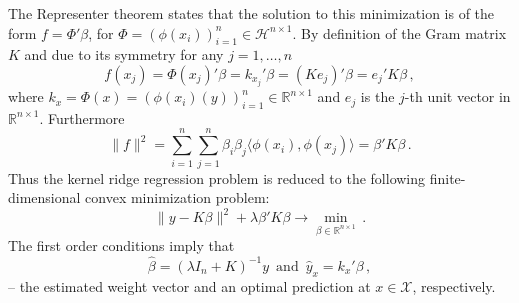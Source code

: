 \documentclass[a4paper,14pt]{extarticle}
\newcommand{\Hcal}{\mathcal{H}}
\newcommand{\Xcal}{\mathcal{X}}
\newcommand{\Real}{\mathbb{R}}
\begin{document}
The Representer theorem states that the solution to this minimization is of the form
$f = \Phi'\beta$, for $\Phi = (\phi(x_i))_{i=1}^n \in \Hcal^{n\times 1}$. By definition
of the Gram matrix $K$ and due to its symmetry for any $j=1,\ldots,n$
\begin{equation*}
  f(x_j)
    = \Phi(x_j)' \beta
    = k_{x_j}' \beta
    = (K e_j)' \beta
    = e_j' K \beta
    \,,
\end{equation*}
where $k_x = \Phi(x) = (\phi(x_i)(y))_{i=1}^n \in \Real^{n\times 1}$ and $e_j$ is
the $j$-th unit vector in $\Real^{n\times 1}$. Furthermore
\begin{equation*}
  \| f \|^2
    = \sum_{i=1}^n\sum_{j=1}^n\beta_i\beta_j \langle\phi(x_i), \phi(x_j)\rangle
    = \beta' K \beta \,.
\end{equation*}
Thus the kernel ridge regression problem is reduced to the following finite-dimensional
convex minimization problem:
\begin{equation*}
  \|y - K \beta \|^2 + \lambda \beta' K \beta
    \to \min_{\beta\in \Real^{n\times 1}} \,.
\end{equation*}
The first order conditions imply that
\begin{equation} \label{eq:krr_approx}
  \hat{\beta} = (\lambda I_n + K)^{-1} y \,\text{ and }\, \hat{y}_x = k_x' \beta \,,
\end{equation}
-- the estimated weight vector and an optimal prediction at $x\in \Xcal$, respectively.
\end{document}
